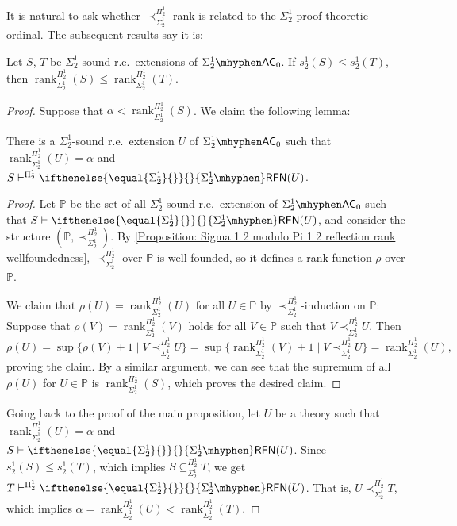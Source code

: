 \documentclass{mhkr}
\newcommand{\bbP}{\mathbb{P}}
\newcommand{\rank}{\operatorname{rank}}
\newcommand{\RFN}[1][]{\ifthenelse{\equal{#1}{}}{}{#1\mhyphen}\mathsf{RFN}}
\newcommand{\AC}{\mathsf{AC}}
\begin{document}
It is natural to ask whether $\prec^{\Pi^1_2}_{\Sigma^1_2}$-rank is related to the $\Sigma^1_2$-proof-theoretic ordinal. The subsequent results say it is:

\begin{proposition} \label{Proposition: Sigma 1 2 reflection rank and s 1 2 incr case}
    Let $S$, $T$ be $\Sigma^1_2$-sound r.e.\ extensions of $\Sigma^1_2\mhyphen\AC_0$.
    If $s^1_2(S)\le s^1_2(T)$, then $\rank^{\Pi^1_2}_{\Sigma^1_2}(S)\le \rank^{\Pi^1_2}_{\Sigma^1_2}(T)$.
\end{proposition}
\begin{proof}
    Suppose that $\alpha < \rank^{\Pi^1_2}_{\Sigma^1_2}(S)$. We claim the following lemma:
    \begin{lemma*}
        There is a $\Sigma^1_2$-sound r.e.\ extension $U$ of $\Sigma^1_2\mhyphen\AC_0$ such that $\rank^{\Pi^1_2}_{\Sigma^1_2}(U) = \alpha$ and $S\vdash^{\Pi^1_2}\RFN[\Sigma^1_2](U)$.
    \end{lemma*}
    \begin{proof}
        Let $\bbP$ be the set of all $\Sigma^1_2$-sound r.e.\ extension of $\Sigma^1_2\mhyphen\AC_0$ such that $S\vdash \RFN[\Sigma^1_2](U)$, and consider the structure $(\bbP, \prec^{\Pi^1_2}_{\Sigma^1_2})$.
        By \autoref{Proposition: Sigma 1 2 modulo Pi 1 2 reflection rank wellfoundedness}, $\prec^{\Pi^1_2}_{\Sigma^1_2}$ over $\bbP$ is well-founded, so it defines a rank function $\rho$ over $\bbP$.

        We claim that $\rho(U) = \rank^{\Pi^1_2}_{\Sigma^1_2}(U)$ for all $U\in \bbP$ by $\prec^{\Pi^1_2}_{\Sigma^1_2}$-induction on $\bbP$:
        Suppose that $\rho(V) = \rank^{\Pi^1_2}_{\Sigma^1_2}(V)$ holds for all $V\in\bbP$ such that $V\prec^{\Pi^1_2}_{\Sigma^1_2}U$.
        Then
        \begin{equation*}
            \rho(U) = \sup\{\rho(V)+1\mid V\prec^{\Pi^1_2}_{\Sigma^1_2} U\} = \sup\{\rank^{\Pi^1_2}_{\Sigma^1_2}(V)+1\mid V\prec^{\Pi^1_2}_{\Sigma^1_2} U\} = \rank^{\Pi^1_2}_{\Sigma^1_2}(U),
        \end{equation*}
        proving the claim.
        By a similar argument, we can see that the supremum of all $\rho(U)$ for $U\in \bbP$ is $\rank^{\Pi^1_2}_{\Sigma^1_2}(S)$, which proves the desired claim.
    \end{proof}

    Going back to the proof of the main proposition, let $U$ be a theory such that $\rank^{\Pi^1_2}_{\Sigma^1_2}(U) = \alpha$ and $S\vdash\RFN[\Sigma^1_2](U)$.
    Since $s^1_2(S)\le s^1_2(T)$, which implies $S\subseteq^{\Pi^1_2}_{\Sigma^1_2}T$, we get $T\vdash^{\Pi^1_2}\RFN[\Sigma^1_2](U)$.
    That is, $U\prec^{\Pi^1_2}_{\Sigma^1_2} T$, which implies $\alpha = \rank^{\Pi^1_2}_{\Sigma^1_2}(U) < \rank^{\Pi^1_2}_{\Sigma^1_2}(T)$.
\end{proof}
\end{document}

